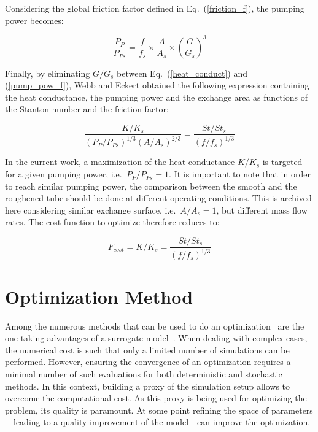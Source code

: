 Considering the global friction factor defined in Eq.~(\ref{friction_f}), the pumping power becomes:

\begin{equation}
\frac{P_{P}}{P_{Ps}} = \frac{f}{f_s} \times \frac{A}{A_s} \times \left( \frac{G}{G_s} \right)^3
\label{pump_pow_f}
\end{equation}

Finally, by eliminating $G/G_s$ between Eq.~(\ref{heat_conduct}) and (\ref{pump_pow_f}), Webb and Eckert obtained the following expression containing the heat conductance, the pumping power and the exchange area as functions of the Stanton number and the friction factor:

\begin{equation}
\frac{K/K_s}{(P_{P}/P_{Ps})^{1/3}(A/A_s)^{2/3}} = \frac{St/St_s}{(f/f_s)^{1/3}}
\label{webb_eckert}
\end{equation}

In the current work, a maximization of the heat conductance $K/K_s$ is targeted for a given pumping power, i.e.~$P_{P}/P_{Ps}=1$. It is important to note that in order to reach similar pumping power, the comparison between the smooth and the roughened tube should be done at different operating conditions. This is archived here considering similar exchange surface, i.e.~$A/A_s=1$, but different mass flow rates. The cost function to optimize therefore reduces to:

\begin{equation}
F_{cost} = K/K_s = \frac{St/St_s}{(f/f_s)^{1/3}}
\label{cost_function}
\end{equation}

\section{Optimization Method}
\label{sec:method}

Among the numerous methods that can be used to do an optimization~\cite{cavazzuti2013} are the one taking advantages of a surrogate model~\cite{forrester2009}. When dealing with complex cases, the numerical cost is such that only a limited number of simulations can be performed. However, ensuring the convergence of an optimization requires a minimal number of such evaluations for both deterministic and stochastic methods. In this context, building a proxy of the simulation setup allows to overcome the computational cost. As this proxy is being used for optimizing the problem, its quality is paramount. At some point refining the space of parameters---leading to a quality improvement of the model---can improve the optimization.

